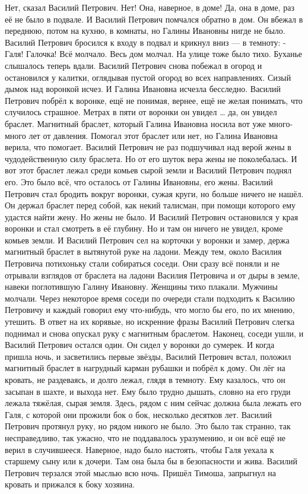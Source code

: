 Нет, сказал Василий Петрович. Нет! Она, наверное, в доме! Да, она в доме, раз её не было в подвале. И Василий Петрович помчался обратно в дом. Он вбежал в переднюю, потом на кухню, в комнаты, но Галины Ивановны нигде не было. Василий Петрович бросился к входу в подвал и крикнул вниз --- в темноту: - Галя! Галочка!
Всё молчало. Весь дом молчал. На улице тоже было тихо. Буханье слышалось теперь вдали. Василий Петрович снова побежал в огород и остановился у калитки, оглядывая пустой огород во всех направлениях. Сизый дымок над воронкой исчез. И Галина Ивановна исчезла бесследно. Василий Петрович побрёл к воронке, ещё не понимая, вернее, ещё не желая понимать, что случилось страшное. Метрах в пяти от воронки он увидел … да, он увидел браслет. Магнитный браслет, который Галина Ивановна носила вот уже много-много лет от давления. Помогал этот браслет или нет, но Галина Ивановна верила, что помогает. Василий Петрович не раз подшучивал над верой жены в чудодейственную силу браслета. Но от его шуток вера жены не поколебалась. И вот этот браслет лежал среди комьев сырой земли и Василий Петрович поднял его. Это было всё, что осталось от Галины Ивановны, его жены. Василий Петрович стал бродить вокруг воронки, сужая круги, но больше ничего не нашёл. Он держал браслет перед собой, как некий талисман, при помощи которого ему удастся найти жену. Но жены не было. И Василий Петрович остановился у края воронки и стал смотреть в её глубину. Но и там он ничего не увидел, кроме комьев земли. И Василий Петрович сел на корточки у воронки и замер, держа магнитный браслет в вытянутой руке на ладони.
Между тем, около Василия Петровича потихоньку стали собираться соседи. Они сразу всё поняли и не отрывали взглядов от браслета на ладони Василия Петровича и от дыры в земле, навеки поглотившую Галину Ивановну. Женщины тихо плакали. Мужчины молчали. Через некоторое время соседи по очереди стали подходить к Василию Петровичу и каждый говорил ему что-нибудь, что могло бы его, по их мнению, утешить. В ответ на их корявые, но искренние фразы Василий Петрович слегка поднимал и снова опускал руку с магнитным браслетом.
Наконец, соседи ушли, и Василий Петрович остался один. Он сидел у воронки до сумерек. И когда пришла ночь, и засветились первые звёзды, Василий Петрович встал, положил магнитный браслет в нагрудный карман рубашки и побрёл к дому. Он лёг на кровать, не раздеваясь, и долго лежал, глядя в темноту. Ему казалось, что он засыпан в шахте, и выхода нет. Ему было трудно дышать, словно на его груди лежала тяжёлая, сырая земля.
Здесь, рядом с ним сейчас должна была лежать его Галя, с которой они прожили бок о бок, несколько десятков лет. Василий Петрович протянул руку, но рядом никого не было. Это было так странно, так несправедливо, так ужасно, что не поддавалось уразумению, и он всё ещё не верил в случившееся. Наверное, надо было настоять, чтобы Галя уехала к старшему сыну или к дочери. Там она была бы в безопасности и жива. Василий Петрович терзался этой мыслью всю ночь. Пришёл Тимоша, запрыгнул на кровать и прижался к боку хозяина.
